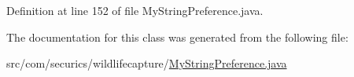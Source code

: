 Definition at line 152 of file My\+String\+Preference.\+java.



The documentation for this class was generated from the following file\+:\begin{DoxyCompactItemize}
\item 
src/com/securics/wildlifecapture/\hyperlink{_my_string_preference_8java}{My\+String\+Preference.\+java}\end{DoxyCompactItemize}
